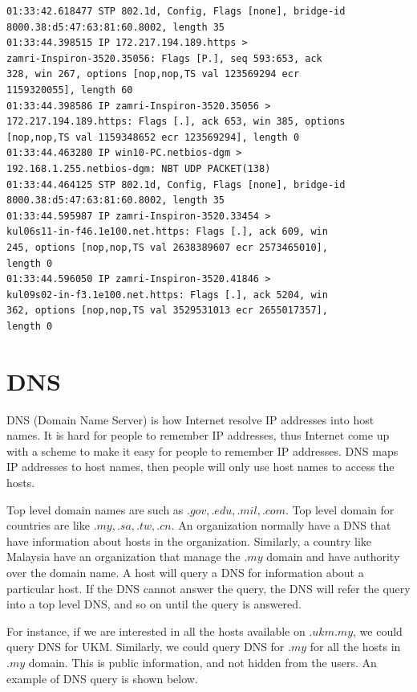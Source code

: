 \documentclass[7x9]{times}
\begin{document}
\begin{verbatim}
01:33:42.618477 STP 802.1d, Config, Flags [none], bridge-id 
8000.38:d5:47:63:81:60.8002, length 35
01:33:44.398515 IP 172.217.194.189.https > 
zamri-Inspiron-3520.35056: Flags [P.], seq 593:653, ack 
328, win 267, options [nop,nop,TS val 123569294 ecr 
1159320055], length 60
01:33:44.398586 IP zamri-Inspiron-3520.35056 > 
172.217.194.189.https: Flags [.], ack 653, win 385, options 
[nop,nop,TS val 1159348652 ecr 123569294], length 0
01:33:44.463280 IP win10-PC.netbios-dgm > 
192.168.1.255.netbios-dgm: NBT UDP PACKET(138)
01:33:44.464125 STP 802.1d, Config, Flags [none], bridge-id 
8000.38:d5:47:63:81:60.8002, length 35
01:33:44.595987 IP zamri-Inspiron-3520.33454 > 
kul06s11-in-f46.1e100.net.https: Flags [.], ack 609, win 
245, options [nop,nop,TS val 2638389607 ecr 2573465010], 
length 0
01:33:44.596050 IP zamri-Inspiron-3520.41846 > 
kul09s02-in-f3.1e100.net.https: Flags [.], ack 5204, win 
362, options [nop,nop,TS val 3529531013 ecr 2655017357], 
length 0
\end{verbatim}














\section{DNS}

DNS (Domain Name Server) is how Internet resolve IP
addresses into host names. It is hard for people to remember
IP addresses, thus Internet come up with a scheme to make it
easy for people to remember IP addresses. DNS maps  IP 
addresses to host names, then people will only use host 
names to access the hosts. 

Top level domain names are such as $.gov, .edu, .mil, .com$.
Top level domain for countries are like $.my, .sa, .tw,
.cn$. An organization normally have a DNS that have 
information about hosts in the organization. Similarly, a 
country like Malaysia have an organization that manage the 
$.my$ domain and have authority over the domain name.
A host will query a  DNS for information about a particular
host. If the DNS cannot answer the query, the DNS will refer
the query into a top level DNS, and so on until the query is
answered.

For instance, if we are interested in all the hosts
available on $.ukm.my$, we could query DNS for UKM\@.
Similarly, we could query DNS for $.my$ for all the hosts in
$.my$ domain. This is public information, and not hidden
from the users. An example of DNS query is shown below.
\end{document}
